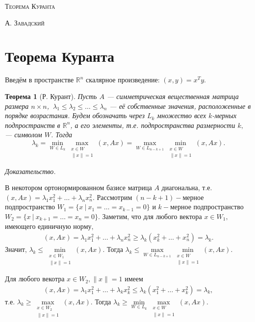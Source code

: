 \documentclass[11pt,a4paper]{article}
\begin{document}
\begin{center}
\scshape{\LARGE{Теорема Куранта}}
\vspace{1cm}

\scshape{А. Завадский}
\end{center}
\section{Теорема Куранта}

Введём в пространстве $\mathbb{R}^n$ скалярное произведение: $(x,y)=x^Ty.$

\newtheorem{theorem}{Теорема}
\begin{theorem} [Р. Курант]

Пусть $A$ --- симметрическая вещественная матрица размера $n\times n$, $~\lambda_1\leqslant\lambda_2\leqslant\ldots\leqslant\lambda_n$ --- её собственные значения, расположенные в порядке возрастания. 
Будем обозначать через $L_k$ множество всех $k$-мерных подпространств в $\mathbb R^{n}$, а его элементы, т.е. подпространства размерности $k,$ --- символом $W$.  Тогда 
$$\lambda_k=\min_{W\in L_{k}}\max_{\substack{x\in W\\\|x\|=1}}(x,Ax)=\max_{W\in L_{n-k+1}}\min_{\substack{x\in W\\\|x\|=1}}(x,Ax).$$
\end{theorem}
\slshape Доказательство.
\upshape

В некотором ортонормированном базисе матрица $A$ диагональна, т.е. $(x,Ax)=\lambda_1x_1^2+\ldots+\lambda_nx_n^2.$ 
Рассмотрим $(n-k+1)-$мерное подпространство $W_1=\{x~|~x_1=\ldots=x_{k-1}=0\}$ и $k-$мерное подпространство  $W_2=\{x~|~x_{k+1}=\ldots=x_n=0\}.$
Заметим, что для любого вектора $x\in W_1,$ имеющего единичную норму, 
\begin{gather}
(x,Ax)=\lambda_1x_1^2+\ldots+\lambda_nx_n^2\geqslant\lambda_k(x_k^2+\ldots+x_n^2)=\lambda_k.\label{1}
\end{gather}
Значит, $\lambda_k\leqslant\min\limits_{\substack{x\in W_1\\\|x\|=1}}(x,Ax).$ Тогда $\lambda_k\leqslant\max\limits_{W\in L_{n-k+1}}\min\limits_{\substack{x\in W\\\|x\|=1}}(x,Ax).$

Для любого векотра $x\in W_2, \|x\|=1$ имеем
\begin{gather}
(x,Ax)=\lambda_1x_1^2+\ldots+\lambda_kx_k^2\leqslant\lambda_k(x_1^2+\ldots+x_k^2)=\lambda_k,\label{2}
\end{gather}
т.е. $\lambda_k\geqslant\max\limits_{\substack{x\in W_2\\\|x\|=1}}(x,Ax).$ Тогда $\lambda_k\geqslant\min\limits_{W\in L_{k}}\max\limits_{\substack{x\in W\\\|x\|=1}}(x,Ax).$
\end{document}
